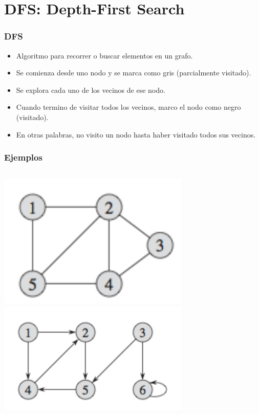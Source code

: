 \documentclass{beamer}
\begin{document}
\section{DFS: Depth-First Search}
	\begin{frame}
		\frametitle{DFS}
		\begin{itemize}
			\item Algoritmo para recorrer o buscar elementos en un grafo.
			\item Se comienza desde uno nodo y se marca como gris (parcialmente visitado).
			\item Se explora cada uno de los vecinos de ese nodo.
			\item Cuando termino de visitar todos los vecinos, marco el nodo como negro (visitado).
			\item En otras palabras, no visito un nodo hasta haber visitado todos sus vecinos.
		\end{itemize}
	\end{frame}
	
	\begin{frame}
		\frametitle{Ejemplos}
		\begin{columns}
				\includegraphics[width = 1.05\textwidth]{GrafoND.png}
				\includegraphics[width = 1.10\textwidth]{GrafoD.png}
		\end{columns}
	\end{frame}
	
\end{document}
